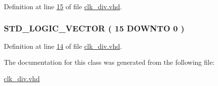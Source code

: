 Definition at line \hyperlink{clk__div_8vhd_source_l00015}{15} of file \hyperlink{clk__div_8vhd_source}{clk\+\_\+div.\+vhd}.

\hypertarget{classclk__div_1_1div_a25d9525383f1b60f7c2e081319516a96}{}
\subsubsection[{count}]{ {\bfseries \textcolor{comment}{S\+T\+D\+\_\+\+L\+O\+G\+I\+C\+\_\+\+V\+E\+C\+T\+O\+R}\textcolor{vhdlchar}{ }\textcolor{vhdlchar}{(}\textcolor{vhdlchar}{ }\textcolor{vhdlchar}{ } \textcolor{vhdldigit}{15} \textcolor{vhdlchar}{ }\textcolor{keywordflow}{D\+O\+W\+N\+T\+O}\textcolor{vhdlchar}{ }\textcolor{vhdlchar}{ } \textcolor{vhdldigit}{0} \textcolor{vhdlchar}{ }\textcolor{vhdlchar}{)}\textcolor{vhdlchar}{ }} \hspace{0.3cm}{\ttfamily [Signal]}}\label{classclk__div_1_1div_a25d9525383f1b60f7c2e081319516a96}


Definition at line \hyperlink{clk__div_8vhd_source_l00014}{14} of file \hyperlink{clk__div_8vhd_source}{clk\+\_\+div.\+vhd}.



The documentation for this class was generated from the following file\+:\begin{DoxyCompactItemize}
\item 
\hyperlink{clk__div_8vhd}{clk\+\_\+div.\+vhd}\end{DoxyCompactItemize}
